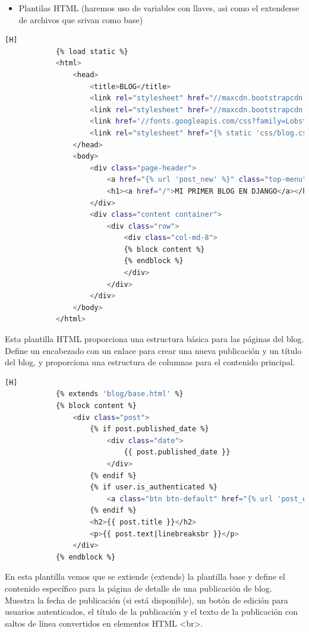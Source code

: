 \documentclass{article}
\begin{document}
        \begin{itemize}	
		\item Plantilas HTML (haremos uso de variables con llaves, asi como el extenderse de archivos que srivan como base)
	\end{itemize}
	\begin{lstlisting}[language=bash,caption={base.html}][H]
            {% load static %}
            <html>
                <head>
                    <title>BLOG</title>
                    <link rel="stylesheet" href="//maxcdn.bootstrapcdn.com/bootstrap/3.2.0/css/bootstrap.min.css">
                    <link rel="stylesheet" href="//maxcdn.bootstrapcdn.com/bootstrap/3.2.0/css/bootstrap-theme.min.css">
                    <link href='//fonts.googleapis.com/css?family=Lobster&subset=latin,latin-ext' rel='stylesheet' type='text/css'>
                    <link rel="stylesheet" href="{% static 'css/blog.css' %}">
                </head>
                <body>
                    <div class="page-header">
                        <a href="{% url 'post_new' %}" class="top-menu"><span class="glyphicon glyphicon-plus"></span></a>
                        <h1><a href="/">MI PRIMER BLOG EN DJANGO</a></h1>
                    </div>
                    <div class="content container">
                        <div class="row">
                            <div class="col-md-8">
                            {% block content %}
                            {% endblock %}
                            </div>
                        </div>
                    </div>
                </body>
            </html>
	\end{lstlisting}
        Esta plantilla HTML proporciona una estructura básica para las páginas del blog. Define un encabezado con un enlace para crear una nueva publicación y un título del blog, y proporciona una estructura de columnas para el contenido principal. 

        \begin{lstlisting}[language=bash,caption={post\_detail.html}][H]
            {% extends 'blog/base.html' %}
            {% block content %}
                <div class="post">
                    {% if post.published_date %}
                        <div class="date">
                            {{ post.published_date }}
                        </div>
                    {% endif %}
                    {% if user.is_authenticated %}
                        <a class="btn btn-default" href="{% url 'post_edit' pk=post.pk %}"><span class="glyphicon glyphicon-pencil"></span></a>
                    {% endif %}
                    <h2>{{ post.title }}</h2>
                    <p>{{ post.text|linebreaksbr }}</p>
                </div>
            {% endblock %}
	\end{lstlisting}
         En esta plantilla vemos que se extiende (extends) la plantilla base y define el contenido específico para la página de detalle de una publicación de blog. Muestra la fecha de publicación (si está disponible), un botón de edición para usuarios autenticados, el título de la publicación y el texto de la publicación con saltos de línea convertidos en elementos HTML <br>.
\end{document}
